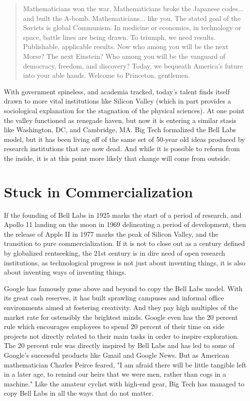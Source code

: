 \documentclass[12pt]{article}
\begin{document}
\begin{quote}
Mathematicians won the war. Mathematicians broke the Japanese codes... and built the A-bomb. Mathematicians... like you. The stated goal of the Soviets is global Communism. In medicine or economics, in technology or space, battle lines are being drawn. To triumph, we need results. Publishable, applicable results. Now who among you will be the next Morse? The next Einstein? Who among you will be the vanguard of democracy, freedom, and discovery? Today, we bequeath America's future into your able hands. Welcome to Princeton, gentlemen.
\end{quote}

With government spineless, and academia tracked, today's talent finds itself drawn to more vital institutions like Silicon Valley (which in part provides a sociological explanation for the stagnation of the physical sciences). At one point the valley functioned as renegade haven, but now it is entering a similar stasis like Washington, DC, and Cambridge, MA. Big Tech formalized the Bell Labs model, but it has been living off of the same set of 50-year old ideas produced by research institutions that are now dead. And while it is possible to reform from the inside, it is at this point more likely that change will come from outside.

\newpage

\section*{Stuck in Commercialization}

If the founding of Bell Labs in 1925 marks the start of a period of research, and Apollo 11 landing on the moon in 1969 delineating a period of development, then the release of Apple II in 1977 marks the peak of Silicon Valley, and the transition to pure commercialization. If it is not to close out as a century defined by globalized rentseeking, the 21st century is in dire need of open research institutions, as technological progress is not just about inventing things, it is also about inventing ways of inventing things.

Google has famously gone above and beyond to copy the Bell Labs model. With its great cash reserves, it has built sprawling campuses and informal office environments aimed at fostering creativity. And they pay high multiples of the market rate for ostensibly the brightest minds. Google even has the 20 percent rule which encourages employees to spend 20 percent of their time on side projects not directly related to their main tasks in order to inspire exploration. The 20 percent rule was directly inspired by Bell Labs and has led to some of Google's successful products like Gmail and Google News. But as American mathematician Charles Peirce feared, "I am afraid there will be little tangible left in a later age, to remind our heirs that we were men, rather than cogs in a machine."\cite{ref1} Like the amateur cyclist with high-end gear, Big Tech has managed to copy Bell Labs in all the ways that do not matter.
\end{document}
